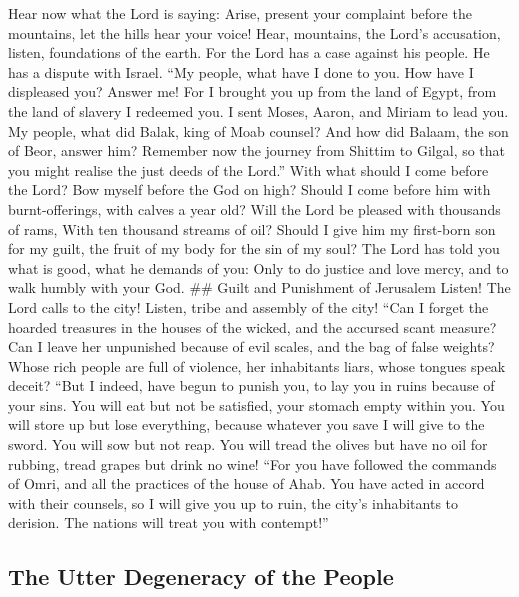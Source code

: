  Hear now what the Lord is saying: Arise, present your
complaint before the mountains, let the hills hear your voice!
 Hear, mountains, the Lord's accusation, listen, foundations
of the earth. For the Lord has a case against his people. He has a
dispute with Israel.  ``My people, what have I done to you.
How have I displeased you? Answer me!  For I brought you up
from the land of Egypt, from the land of slavery I redeemed you. I sent
Moses, Aaron, and Miriam to lead you.  My people, what did
Balak, king of Moab counsel? And how did Balaam, the son of Beor, answer
him? Remember now the journey from Shittim to Gilgal, so that you might
realise the just deeds of the Lord.''  With what should I
come before the Lord? Bow myself before the God on high? Should I come
before him with burnt-offerings, with calves a year old? 
Will the Lord be pleased with thousands of rams, With ten thousand
streams of oil? Should I give him my first-born son for my guilt, the
fruit of my body for the sin of my soul?  The Lord has told
you what is good, what he demands of you: Only to do justice and love
mercy, and to walk humbly with your God. \#\# Guilt and Punishment of
Jerusalem  Listen! The Lord calls to the city! Listen, tribe
and assembly of the city!  ``Can I forget the hoarded
treasures in the houses of the wicked, and the accursed scant measure?
 Can I leave her unpunished because of evil scales, and the
bag of false weights?  Whose rich people are full of
violence, her inhabitants liars, whose tongues speak deceit?
 ``But I indeed, have begun to punish you, to lay you in
ruins because of your sins.  You will eat but not be
satisfied, your stomach empty within you. You will store up but lose
everything, because whatever you save I will give to the sword.
 You will sow but not reap. You will tread the olives but
have no oil for rubbing, tread grapes but drink no wine! 
``For you have followed the commands of Omri, and all the practices of
the house of Ahab. You have acted in accord with their counsels, so I
will give you up to ruin, the city's inhabitants to derision. The
nations will treat you with contempt!''

\hypertarget{the-utter-degeneracy-of-the-people}{%
\subsection{The Utter Degeneracy of the
People}\label{the-utter-degeneracy-of-the-people}}


